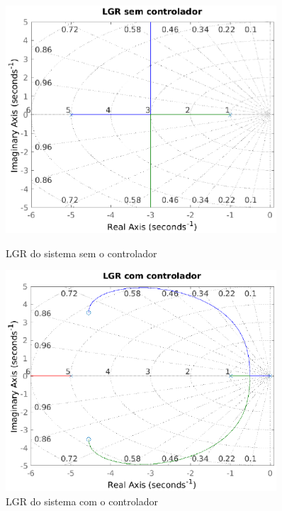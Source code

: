         \begin{figure}[!ht]
            \centering
            \begin{minipage}{0.5\textwidth}
                \centering
                \includegraphics[width=0.9\textwidth]{Figuras/ProblemaPID/LGRsemControladorq1.eps}
                \caption{LGR do sistema sem o controlador}
                \label{fig:LGRsem}
            \end{minipage}\hfill
            \begin{minipage}{0.5\textwidth}
                \centering
                \includegraphics[width=0.9\textwidth]{Figuras/ProblemaPID/LGRcomControladorq1.eps}
                \caption{LGR do sistema com o controlador}
                \label{fig:LGRcom}
            \end{minipage}
        \end{figure}

